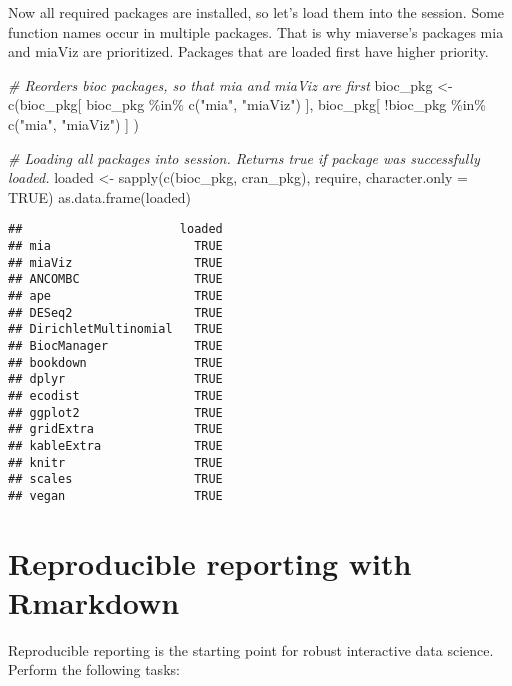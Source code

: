 \documentclass[
  oneside]{book}
\newenvironment{Shaded}{\begin{snugshade}}{\end{snugshade}}
\newcommand{\AttributeTok}[1]{\textcolor[rgb]{0.77,0.63,0.00}{#1}}
\newcommand{\CommentTok}[1]{\textcolor[rgb]{0.56,0.35,0.01}{\textit{#1}}}
\newcommand{\ConstantTok}[1]{\textcolor[rgb]{0.00,0.00,0.00}{#1}}
\newcommand{\FunctionTok}[1]{\textcolor[rgb]{0.00,0.00,0.00}{#1}}
\newcommand{\NormalTok}[1]{#1}
\newcommand{\OtherTok}[1]{\textcolor[rgb]{0.56,0.35,0.01}{#1}}
\newcommand{\SpecialCharTok}[1]{\textcolor[rgb]{0.00,0.00,0.00}{#1}}
\newcommand{\StringTok}[1]{\textcolor[rgb]{0.31,0.60,0.02}{#1}}
\begin{document}
Now all required packages are installed, so let's load them into the session.
Some function names occur in multiple packages. That is why miaverse's packages
mia and miaViz are prioritized. Packages that are loaded first have higher priority.

\begin{Shaded}
\begin{Highlighting}[]
\CommentTok{\# Reorders bioc packages, so that mia and miaViz are first}
\NormalTok{bioc\_pkg }\OtherTok{\textless{}{-}} \FunctionTok{c}\NormalTok{(bioc\_pkg[ bioc\_pkg }\SpecialCharTok{\%in\%} \FunctionTok{c}\NormalTok{(}\StringTok{"mia"}\NormalTok{, }\StringTok{"miaViz"}\NormalTok{) ], }
\NormalTok{              bioc\_pkg[ }\SpecialCharTok{!}\NormalTok{bioc\_pkg }\SpecialCharTok{\%in\%} \FunctionTok{c}\NormalTok{(}\StringTok{"mia"}\NormalTok{, }\StringTok{"miaViz"}\NormalTok{) ] ) }

\CommentTok{\# Loading all packages into session. Returns true if package was successfully loaded.}
\NormalTok{loaded }\OtherTok{\textless{}{-}} \FunctionTok{sapply}\NormalTok{(}\FunctionTok{c}\NormalTok{(bioc\_pkg, cran\_pkg), require, }\AttributeTok{character.only =} \ConstantTok{TRUE}\NormalTok{)}
\FunctionTok{as.data.frame}\NormalTok{(loaded)}
\end{Highlighting}
\end{Shaded}

\begin{verbatim}
##                      loaded
## mia                    TRUE
## miaViz                 TRUE
## ANCOMBC                TRUE
## ape                    TRUE
## DESeq2                 TRUE
## DirichletMultinomial   TRUE
## BiocManager            TRUE
## bookdown               TRUE
## dplyr                  TRUE
## ecodist                TRUE
## ggplot2                TRUE
## gridExtra              TRUE
## kableExtra             TRUE
## knitr                  TRUE
## scales                 TRUE
## vegan                  TRUE
\end{verbatim}

\hypertarget{reproducible-reporting-with-rmarkdown}{%
\chapter{Reproducible reporting with Rmarkdown}\label{reproducible-reporting-with-rmarkdown}}

Reproducible reporting is the starting point for robust interactive
data science. Perform the following tasks:
\end{document}
